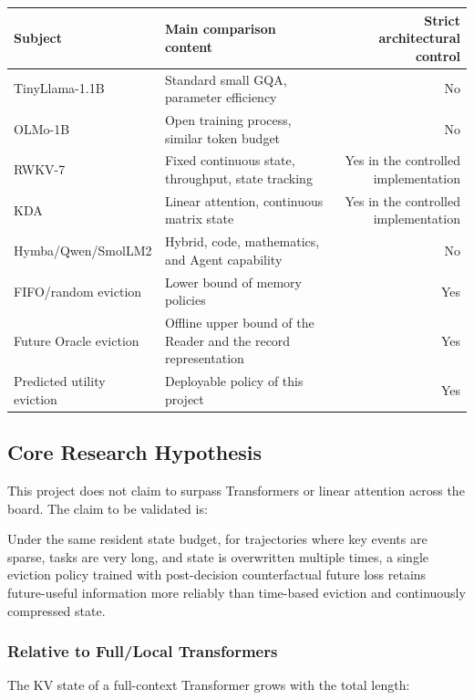 \begin{table}[htbp]\centering
\begin{tabular}{llr}\toprule
Subject & Main comparison content & Strict architectural control\\
\midrule
TinyLlama-1.1B & Standard small GQA, parameter efficiency & No\\
OLMo-1B & Open training process, similar token budget & No\\
RWKV-7 & Fixed continuous state, throughput, state tracking & Yes in the controlled implementation\\
KDA & Linear attention, continuous matrix state & Yes in the controlled implementation\\
Hymba/Qwen/SmolLM2 & Hybrid, code, mathematics, and Agent capability & No\\
FIFO/random eviction & Lower bound of memory policies & Yes\\
Future Oracle eviction & Offline upper bound of the Reader and the record representation & Yes\\
Predicted utility eviction & Deployable policy of this project & Yes\\
\bottomrule
\end{tabular}
\end{table}

\subsection{Core Research Hypothesis}

This project does not claim to surpass Transformers or linear attention across the board. The claim to be validated is:

\begin{notesquote}
Under the same resident state budget, for trajectories where key events are sparse, tasks are very long, and state is overwritten multiple times, a single eviction policy trained with post-decision counterfactual future loss retains future-useful information more reliably than time-based eviction and continuously compressed state.
\end{notesquote}

\subsubsection{Relative to Full/Local Transformers}

The KV state of a full-context Transformer grows with the total length:

